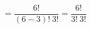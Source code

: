 \documentclass[preview]{standalone}
\begin{document}
\begin{center}
\[ = \frac{ \: 6! \: }{(6-3)! \: 3!}= \frac{ \: 6! \: }{3! \: 3!}\]
\end{center}
\end{document}
